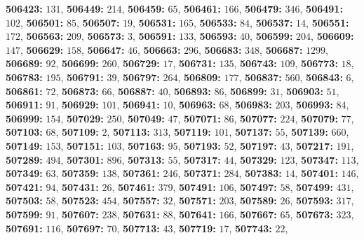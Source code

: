 \textsf{\bfseries 506423:} $131$, \textsf{\bfseries 506449:} $214$, \textsf{\bfseries 506459:} $65$, \textsf{\bfseries 506461:} $166$, \textsf{\bfseries 506479:} $346$, \textsf{\bfseries 506491:} $102$, \textsf{\bfseries 506501:} $85$, \textsf{\bfseries 506507:} $19$, \textsf{\bfseries 506531:} $165$, \textsf{\bfseries 506533:} $84$, \textsf{\bfseries 506537:} $14$, \textsf{\bfseries 506551:} $172$, \textsf{\bfseries 506563:} $209$, \textsf{\bfseries 506573:} $3$, \textsf{\bfseries 506591:} $133$, \textsf{\bfseries 506593:} $40$, \textsf{\bfseries 506599:} $204$, \textsf{\bfseries 506609:} $147$, \textsf{\bfseries 506629:} $158$, \textsf{\bfseries 506647:} $46$, \textsf{\bfseries 506663:} $296$, \textsf{\bfseries 506683:} $348$, \textsf{\bfseries 506687:} $1299$, \textsf{\bfseries 506689:} $92$, \textsf{\bfseries 506699:} $260$, \textsf{\bfseries 506729:} $17$, \textsf{\bfseries 506731:} $135$, \textsf{\bfseries 506743:} $109$, \textsf{\bfseries 506773:} $18$, \textsf{\bfseries 506783:} $195$, \textsf{\bfseries 506791:} $39$, \textsf{\bfseries 506797:} $264$, \textsf{\bfseries 506809:} $177$, \textsf{\bfseries 506837:} $560$, \textsf{\bfseries 506843:} $6$, \textsf{\bfseries 506861:} $72$, \textsf{\bfseries 506873:} $66$, \textsf{\bfseries 506887:} $40$, \textsf{\bfseries 506893:} $86$, \textsf{\bfseries 506899:} $31$, \textsf{\bfseries 506903:} $51$, \textsf{\bfseries 506911:} $91$, \textsf{\bfseries 506929:} $101$, \textsf{\bfseries 506941:} $10$, \textsf{\bfseries 506963:} $68$, \textsf{\bfseries 506983:} $203$, \textsf{\bfseries 506993:} $84$, \textsf{\bfseries 506999:} $154$, \textsf{\bfseries 507029:} $250$, \textsf{\bfseries 507049:} $47$, \textsf{\bfseries 507071:} $86$, \textsf{\bfseries 507077:} $224$, \textsf{\bfseries 507079:} $77$, \textsf{\bfseries 507103:} $68$, \textsf{\bfseries 507109:} $2$, \textsf{\bfseries 507113:} $313$, \textsf{\bfseries 507119:} $101$, \textsf{\bfseries 507137:} $55$, \textsf{\bfseries 507139:} $660$, \textsf{\bfseries 507149:} $153$, \textsf{\bfseries 507151:} $103$, \textsf{\bfseries 507163:} $95$, \textsf{\bfseries 507193:} $52$, \textsf{\bfseries 507197:} $43$, \textsf{\bfseries 507217:} $191$, \textsf{\bfseries 507289:} $494$, \textsf{\bfseries 507301:} $896$, \textsf{\bfseries 507313:} $55$, \textsf{\bfseries 507317:} $44$, \textsf{\bfseries 507329:} $123$, \textsf{\bfseries 507347:} $113$, \textsf{\bfseries 507349:} $63$, \textsf{\bfseries 507359:} $138$, \textsf{\bfseries 507361:} $246$, \textsf{\bfseries 507371:} $284$, \textsf{\bfseries 507383:} $14$, \textsf{\bfseries 507401:} $146$, \textsf{\bfseries 507421:} $94$, \textsf{\bfseries 507431:} $26$, \textsf{\bfseries 507461:} $379$, \textsf{\bfseries 507491:} $106$, \textsf{\bfseries 507497:} $58$, \textsf{\bfseries 507499:} $431$, \textsf{\bfseries 507503:} $58$, \textsf{\bfseries 507523:} $454$, \textsf{\bfseries 507557:} $32$, \textsf{\bfseries 507571:} $203$, \textsf{\bfseries 507589:} $26$, \textsf{\bfseries 507593:} $317$, \textsf{\bfseries 507599:} $91$, \textsf{\bfseries 507607:} $238$, \textsf{\bfseries 507631:} $88$, \textsf{\bfseries 507641:} $166$, \textsf{\bfseries 507667:} $65$, \textsf{\bfseries 507673:} $323$, \textsf{\bfseries 507691:} $116$, \textsf{\bfseries 507697:} $70$, \textsf{\bfseries 507713:} $43$, \textsf{\bfseries 507719:} $17$, \textsf{\bfseries 507743:} $22$, 
